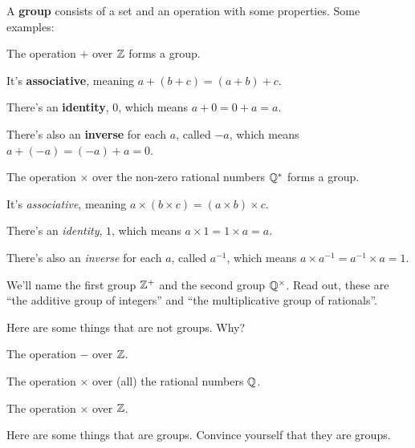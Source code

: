 \documentclass[11pt,paper=letter]{scrartcl}
\renewcommand{\bluebf}[1]{{\bfseries \color{Blue} #1}}
\begin{document}
A \bluebf{group} consists of a set and an operation with some properties. Some examples:

\begin{itemthin}
  \item The operation $+$ over $\mathbb Z$ forms a group.
  \begin{itemthin}
  \item It's \bluebf{associative}, meaning $a + (b + c) = (a + b) + c$.
  \item There's an \bluebf{identity}, $0$, which means $a + 0 = 0 + a = a$.
  \item There's also an \textbf{inverse} for each $a$, called $-a$, which means $a + (-a) = (-a) + a = 0$.
  \end{itemthin}
  \item The operation $\times$ over the non-zero rational numbers $\mathbb Q^*$ forms a group.
  \begin{itemthin}
  \item It's \textit{associative}, meaning $a \times (b \times c) = (a \times b) \times c$.
  \item There's an \textit{identity}, $1$, which means $a \times 1 = 1 \times a = a$.
  \item There's also an \textit{inverse} for each $a$, called $a^{-1}$, which means $a \times a^{-1} = a^{-1} \times a = 1$.
  \end{itemthin}
\end{itemthin}

We'll name the first group $\mathbb Z^+$ and the second group $ \mathbb Q^{\times} $. Read out, these are ``the additive group of integers'' and ``the multiplicative group of rationals''.

Here are some things that are not groups. Why?

\begin{itemthin}
  \item The operation $-$ over $\mathbb Z$.
  \item The operation $\times$ over (all) the rational numbers $\mathbb Q$.
  \item The operation $\times$ over $\mathbb Z$.
\end{itemthin}

Here are some things that are groups. Convince yourself that they are groups.
\end{document}
